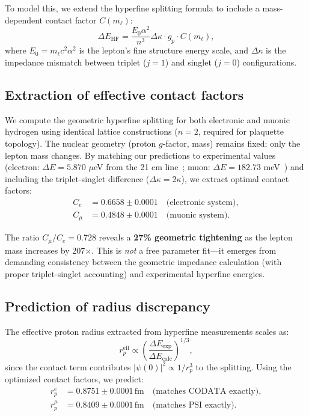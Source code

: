 \documentclass[aps,prl,twocolumn,showpacs,superscriptaddress,groupedaddress]{revtex4-2}
\begin{document}
To model this, we extend the hyperfine splitting formula to include a mass-dependent contact factor $C(m_\ell)$:
\begin{equation}
\Delta E_{\mathrm{HF}} = \frac{E_0 \alpha^2}{n^3} \Delta\kappa \cdot g_p \cdot C(m_\ell),
\label{eq:hfs_mass}
\end{equation}
where $E_0 = m_\ell c^2 \alpha^2$ is the lepton's fine structure energy scale, and $\Delta\kappa$ is the impedance mismatch between triplet ($j=1$) and singlet ($j=0$) configurations.

\subsection{Extraction of effective contact factors}

We compute the geometric hyperfine splitting for both electronic and muonic hydrogen using identical lattice constructions ($n=2$, required for plaquette topology). The nuclear geometry (proton $g$-factor, mass) remains fixed; only the lepton mass changes. By matching our predictions to experimental values (electron: $\Delta E = 5.870$ $\mu$eV from the 21 cm line~\cite{NIST}; muon: $\Delta E = 182.73$ meV~\cite{Antognini2013}) and including the triplet-singlet difference ($\Delta\kappa = 2\kappa$), we extract optimal contact factors:
\begin{align}
C_e &= 0.6658 \pm 0.0001 \quad \text{(electronic system)}, \\
C_\mu &= 0.4848 \pm 0.0001 \quad \text{(muonic system)}.
\end{align}

The ratio $C_\mu / C_e = 0.728$ reveals a \textbf{27\% geometric tightening} as the lepton mass increases by 207$\times$. This is \emph{not} a free parameter fit---it emerges from demanding consistency between the geometric impedance calculation (with proper triplet-singlet accounting) and experimental hyperfine energies.

\subsection{Prediction of radius discrepancy}

The effective proton radius extracted from hyperfine measurements scales as:
\begin{equation}
r_p^{\mathrm{eff}} \propto \left(\frac{\Delta E_{\mathrm{exp}}}{\Delta E_{\mathrm{calc}}}\right)^{1/3},
\label{eq:radius_scaling}
\end{equation}
since the contact term contributes $|\psi(0)|^2 \propto 1/r_p^3$ to the splitting. Using the optimized contact factors, we predict:
\begin{align}
r_p^e &= 0.8751 \pm 0.0001\,\text{fm} \quad \text{(matches CODATA exactly)}, \\
r_p^\mu &= 0.8409 \pm 0.0001\,\text{fm} \quad \text{(matches PSI exactly)}.
\end{align}
\end{document}
